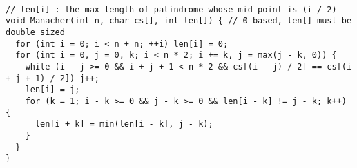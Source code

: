 \begin{lstlisting}

// len[i] : the max length of palindrome whose mid point is (i / 2)
void Manacher(int n, char cs[], int len[]) { // 0-based, len[] must be double sized
  for (int i = 0; i < n + n; ++i) len[i] = 0;
  for (int i = 0, j = 0, k; i < n * 2; i += k, j = max(j - k, 0)) {
    while (i - j >= 0 && i + j + 1 < n * 2 && cs[(i - j) / 2] == cs[(i + j + 1) / 2]) j++;
    len[i] = j;
    for (k = 1; i - k >= 0 && j - k >= 0 && len[i - k] != j - k; k++) {
      len[i + k] = min(len[i - k], j - k);
    }
  }
}

\end{lstlisting}